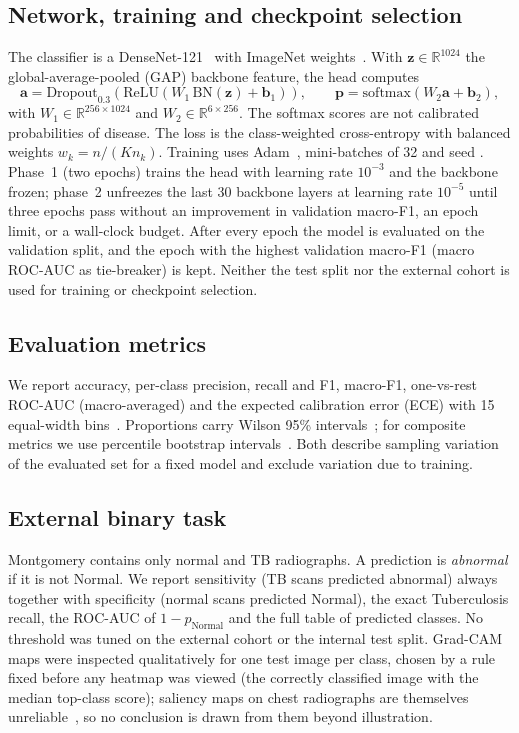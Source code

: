 \subsection{Network, training and checkpoint selection}
The classifier is a DenseNet-121~\cite{huang2017densely} with ImageNet weights~\cite{deng2009imagenet}. With $\mathbf{z}\in\mathbb{R}^{1024}$ the global-average-pooled (GAP) backbone feature, the head computes
\begin{equation}
\mathbf{a}=\mathrm{Dropout}_{0.3}\!\left(\mathrm{ReLU}\!\left(W_1\,\mathrm{BN}(\mathbf{z})+\mathbf{b}_1\right)\right),\qquad
\mathbf{p}=\mathrm{softmax}(W_2\mathbf{a}+\mathbf{b}_2),
\label{eq:head}
\end{equation}
with $W_1\in\mathbb{R}^{256\times1024}$ and $W_2\in\mathbb{R}^{6\times256}$. The softmax scores are not calibrated probabilities of disease. The loss is the class-weighted cross-entropy with balanced weights $w_k=n/(K n_k)$. Training uses Adam~\cite{kingma2015adam}, mini-batches of 32 and seed \RSeed. Phase~1 (two epochs) trains the head with learning rate $10^{-3}$ and the backbone frozen; phase~2 unfreezes the last 30 backbone layers at learning rate $10^{-5}$ until three epochs pass without an improvement in validation macro-F1, an epoch limit, or a wall-clock budget. After every epoch the model is evaluated on the validation split, and the epoch with the highest validation macro-F1 (macro ROC-AUC as tie-breaker) is kept. Neither the test split nor the external cohort is used for training or checkpoint selection.

\subsection{Evaluation metrics}
\label{sec:metrics}
We report accuracy, per-class precision, recall and F1, macro-F1, one-vs-rest ROC-AUC (macro-averaged) and the expected calibration error (ECE) with 15 equal-width bins~\cite{naeini2015obtaining,guo2017calibration}. Proportions carry Wilson 95\% intervals~\cite{wilson1927probable}; for composite metrics we use percentile bootstrap intervals~\cite{efron1994introduction}. Both describe sampling variation of the evaluated set for a fixed model and exclude variation due to training.

\subsection{External binary task}
\label{sec:exttask}
Montgomery contains only normal and TB radiographs. A prediction is \emph{abnormal} if it is not Normal. We report sensitivity (TB scans predicted abnormal) always together with specificity (normal scans predicted Normal), the exact Tuberculosis recall, the ROC-AUC of $1-p_{\text{Normal}}$ and the full table of predicted classes. No threshold was tuned on the external cohort or the internal test split. Grad-CAM~\cite{selvaraju2017gradcam} maps were inspected qualitatively for one test image per class, chosen by a rule fixed before any heatmap was viewed (the correctly classified image with the median top-class score); saliency maps on chest radiographs are themselves unreliable~\cite{arun2021assessing}, so no conclusion is drawn from them beyond illustration.

